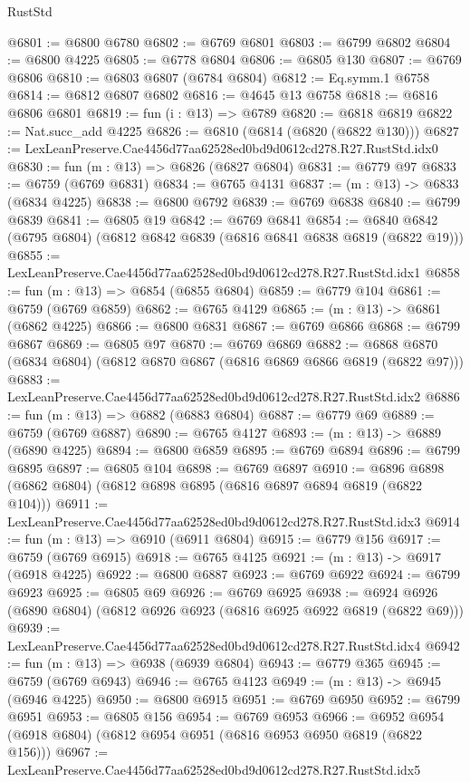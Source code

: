 \begin{lexlean}{RustStd}
\begin{coremodule}
@6801 := @6800 @6780
@6802 := @6769 @6801
@6803 := @6799 @6802
@6804 := @6800 @4225
@6805 := @6778 @6804
@6806 := @6805 @130
@6807 := @6769 @6806
@6810 := @6803 @6807 (@6784 @6804)
@6812 := Eq.symm.{1} @6758
@6814 := @6812 @6807 @6802
@6816 := @4645 @13 @6758
@6818 := @6816 @6806 @6801
@6819 := fun (i : @13) => @6789
@6820 := @6818 @6819
@6822 := Nat.succ_add @4225
@6826 := @6810 (@6814 (@6820 (@6822 @130)))
@6827 := LexLeanPreserve.Cae4456d77aa62528ed0bd9d0612cd278.R27.RustStd.idx0
@6830 := fun (m : @13) => @6826 (@6827 @6804)
@6831 := @6779 @97
@6833 := @6759 (@6769 @6831)
@6834 := @6765 @4131
@6837 := (m : @13) -> @6833 (@6834 @4225)
@6838 := @6800 @6792
@6839 := @6769 @6838
@6840 := @6799 @6839
@6841 := @6805 @19
@6842 := @6769 @6841
@6854 := @6840 @6842 (@6795 @6804) (@6812 @6842 @6839 (@6816 @6841 @6838 @6819 (@6822 @19)))
@6855 := LexLeanPreserve.Cae4456d77aa62528ed0bd9d0612cd278.R27.RustStd.idx1
@6858 := fun (m : @13) => @6854 (@6855 @6804)
@6859 := @6779 @104
@6861 := @6759 (@6769 @6859)
@6862 := @6765 @4129
@6865 := (m : @13) -> @6861 (@6862 @4225)
@6866 := @6800 @6831
@6867 := @6769 @6866
@6868 := @6799 @6867
@6869 := @6805 @97
@6870 := @6769 @6869
@6882 := @6868 @6870 (@6834 @6804) (@6812 @6870 @6867 (@6816 @6869 @6866 @6819 (@6822 @97)))
@6883 := LexLeanPreserve.Cae4456d77aa62528ed0bd9d0612cd278.R27.RustStd.idx2
@6886 := fun (m : @13) => @6882 (@6883 @6804)
@6887 := @6779 @69
@6889 := @6759 (@6769 @6887)
@6890 := @6765 @4127
@6893 := (m : @13) -> @6889 (@6890 @4225)
@6894 := @6800 @6859
@6895 := @6769 @6894
@6896 := @6799 @6895
@6897 := @6805 @104
@6898 := @6769 @6897
@6910 := @6896 @6898 (@6862 @6804) (@6812 @6898 @6895 (@6816 @6897 @6894 @6819 (@6822 @104)))
@6911 := LexLeanPreserve.Cae4456d77aa62528ed0bd9d0612cd278.R27.RustStd.idx3
@6914 := fun (m : @13) => @6910 (@6911 @6804)
@6915 := @6779 @156
@6917 := @6759 (@6769 @6915)
@6918 := @6765 @4125
@6921 := (m : @13) -> @6917 (@6918 @4225)
@6922 := @6800 @6887
@6923 := @6769 @6922
@6924 := @6799 @6923
@6925 := @6805 @69
@6926 := @6769 @6925
@6938 := @6924 @6926 (@6890 @6804) (@6812 @6926 @6923 (@6816 @6925 @6922 @6819 (@6822 @69)))
@6939 := LexLeanPreserve.Cae4456d77aa62528ed0bd9d0612cd278.R27.RustStd.idx4
@6942 := fun (m : @13) => @6938 (@6939 @6804)
@6943 := @6779 @365
@6945 := @6759 (@6769 @6943)
@6946 := @6765 @4123
@6949 := (m : @13) -> @6945 (@6946 @4225)
@6950 := @6800 @6915
@6951 := @6769 @6950
@6952 := @6799 @6951
@6953 := @6805 @156
@6954 := @6769 @6953
@6966 := @6952 @6954 (@6918 @6804) (@6812 @6954 @6951 (@6816 @6953 @6950 @6819 (@6822 @156)))
@6967 := LexLeanPreserve.Cae4456d77aa62528ed0bd9d0612cd278.R27.RustStd.idx5

\end{coremodule}
\end{lexlean}
